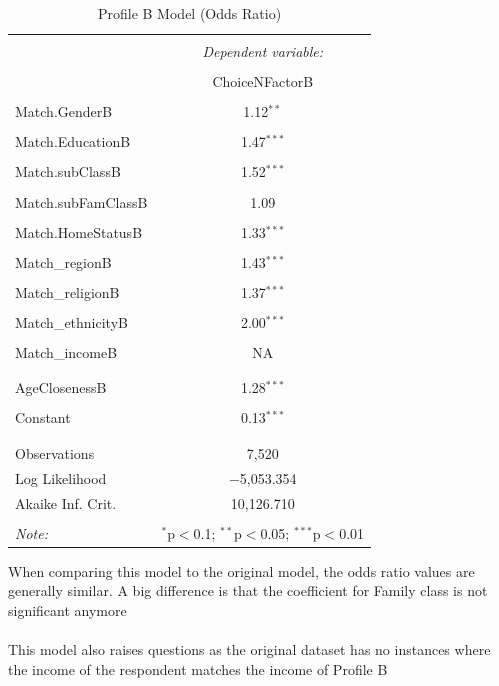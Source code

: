 \documentclass{article}
\begin{document}
\begin{table}[H] \centering 
  \caption{Profile B Model (Odds Ratio)} 
  \label{} 
\begin{tabular}{@{\extracolsep{5pt}}lc} 
\\[-1.8ex]\hline 
\hline \\[-1.8ex] 
 & \multicolumn{1}{c}{\textit{Dependent variable:}} \\ 
\cline{2-2} 
\\[-1.8ex] & ChoiceNFactorB \\ 
\hline \\[-1.8ex] 
 Match.GenderB & 1.12$^{**}$ \\
  & \\ 
 Match.EducationB & 1.47$^{***}$ \\ 
  & \\ 
 Match.subClassB & 1.52$^{***}$ \\
  & \\ 
 Match.subFamClassB & 1.09 \\ 
  & \\ 
 Match.HomeStatusB & 1.33$^{***}$ \\ 
  & \\ 
 Match\_regionB & 1.43$^{***}$ \\ 
  & \\ 
 Match\_religionB & 1.37$^{***}$ \\
  & \\ 
 Match\_ethnicityB & 2.00$^{***}$ \\ 
  & \\ 
 Match\_incomeB &  NA\\ 
  &  \\ 
  & \\ 
 AgeClosenessB & 1.28$^{***}$ \\
  & \\ 
 Constant & 0.13$^{***}$ \\ 
  & \\ 
\hline \\[-1.8ex] 
Observations & 7,520 \\ 
Log Likelihood & $-$5,053.354 \\ 
Akaike Inf. Crit. & 10,126.710 \\ 
\hline 
\hline \\[-1.8ex] 
\textit{Note:}  & \multicolumn{1}{r}{$^{*}$p$<$0.1; $^{**}$p$<$0.05; $^{***}$p$<$0.01} \\ 
\end{tabular} 
\end{table} 
When comparing this model to the original model, the odds ratio values are generally similar. A big difference is that the coefficient for Family class is not significant anymore
\\
\\
This model also raises questions as the original dataset has no instances where the income of the respondent matches the income of Profile B 
\end{document}
